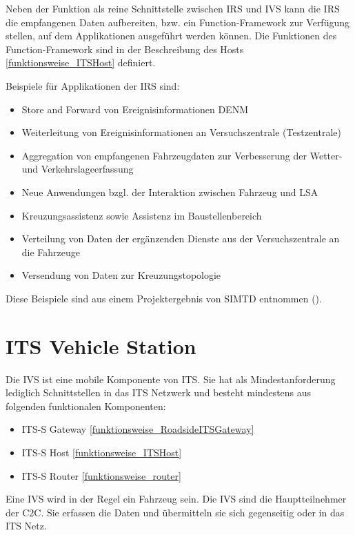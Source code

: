 Neben der Funktion als reine Schnittstelle zwischen \ac{IRS} und \ac{IVS} kann die \ac{IRS} die empfangenen Daten aufbereiten, bzw. ein Function-Framework zur Verfügung stellen, auf dem Applikationen ausgeführt werden können. Die Funktionen des Function-Framework sind in der Beschreibung des Hosts \ref{funktionsweise_ITSHost} definiert.  

Beispiele für Applikationen der \ac{IRS} sind:
\begin{itemize}
	\item Store and Forward von Ereignisinformationen \ac{DENM}
	\item Weiterleitung von Ereignisinformationen an Versuchszentrale (Testzentrale)
	\item Aggregation von empfangenen Fahrzeugdaten zur Verbesserung der Wetter- und Verkehrslageerfassung
	\item Neue Anwendungen bzgl. der Interaktion zwischen Fahrzeug und LSA
	\item  Kreuzungsassistenz sowie Assistenz im Baustellenbereich
	\item Verteilung von Daten der ergänzenden Dienste aus der Versuchszentrale an die Fahrzeuge
	\item Versendung von Daten zur Kreuzungstopologie
\end{itemize}

Diese Beispiele sind aus einem Projektergebnis von \ac{SIMTD} entnommen (\cite{simtd-D12.1}). 



\section{ITS Vehicle Station}
Die \ac{IVS} ist eine mobile Komponente von \ac{ITS}. Sie hat als Mindestanforderung lediglich Schnittstellen in das \ac{ITS} Netzwerk und besteht mindestens aus folgenden funktionalen Komponenten:
\begin{itemize}
	\item  \ac{ITS-S} Gateway \ref{funktionsweise_RoadsideITSGateway}
	\item \ac{ITS-S} Host \ref{funktionsweise_ITSHost}
	\item \ac{ITS-S} Router \ref{funktionsweise_router} 
\end{itemize}

Eine \ac{IVS} wird in der Regel ein Fahrzeug sein. Die \ac{IVS} sind die Hauptteilnehmer der \ac{C2C}. Sie erfassen die Daten und übermitteln sie sich gegenseitig oder in das \ac{ITS} Netz. 
